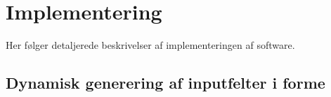 \chapter{Implementering}

Her følger detaljerede beskrivelser af implementeringen af software.

\section{Dynamisk generering af inputfelter i forme}
